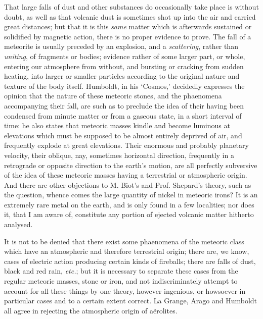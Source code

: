 \documentclass[a4paper, 12pt, oneside]{article}
\begin{document}
That large falls of dust and other substances do occasionally take place is without doubt, as well as that volcanic dust is sometimes shot up into the air and carried great distances; but that it is this \emph{same} matter which is afterwards sustained or solidified by magnetic action, there is no proper evidence to prove. The fall of a meteorite is usually preceded by an explosion, and a \emph{scattering}, rather than \emph{uniting}, of fragments or bodies; evidence rather of some larger part, or whole, entering our atmosphere from without, and bursting or cracking from sudden heating, into larger or smaller particles according to the original nature and texture of the body itself. Humboldt, in his `Cosmos,' decidedly expresses the opinion that the nature of these meteoric stones, and the phaenomena accompanying their fall, are such as to preclude the idea of their having been condensed from minute matter or from a gaseous state, in a short interval of time: he also states that meteoric masses kindle and become luminous at elevations which must be supposed to be almost entirely deprived of air, and frequently explode at great elevations. Their enormous and probably planetary velocity, their oblique, nay, sometimes horizontal direction, frequently in a retrograde or opposite direction to the earth's motion, are all perfectly subversive of the idea of these meteoric masses having a terrestrial or atmospheric origin. And there are other objections to M. Biot's and Prof. Shepard's theory, such as the question, whence comes the large quantity of nickel in meteoric irons? It is an extremely rare metal on the earth, and is only found in a few localities; nor does it, that I am aware of, constitute any portion of ejected volcanic matter hitherto analysed.

It is not to be denied that there exist some phaenomena of the meteoric class which have an atmospheric and therefore terrestrial origin; there are, we know, cases of electric action producing certain kinds of fireballs; there are falls of dust, black and red rain, \emph{etc.}; but it is necessary to separate these cases from the regular meteoric masses, stone or iron, and not indiscriminately attempt to account for all these things by one theory, however ingenious, or howsoever in particular cases and to a certain extent correct. La Grange, Arago and Humboldt all agree in rejecting the atmospheric origin of aërolites.
\end{document}
